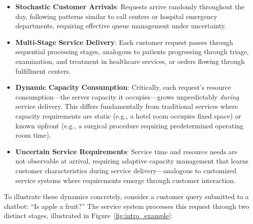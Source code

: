 \documentclass[poms,final,blindrev]{poms1_V1} %
\begin{document}
\begin{itemize}
    \item \textbf{Stochastic Customer Arrivals}: Requests arrive randomly throughout the day, following patterns similar to call centers or hospital emergency departments, requiring effective queue management under uncertainty.
    
    \item \textbf{Multi-Stage Service Delivery}: Each customer request passes through sequential processing stages, analogous to patients progressing through triage, examination, and treatment in healthcare services, or orders flowing through fulfillment centers.
    
    \item \textbf{Dynamic Capacity Consumption}: Critically, each request's resource consumption—the server capacity it occupies—grows unpredictably \textit{during} service delivery. This differs fundamentally from traditional services where capacity requirements are static (e.g., a hotel room occupies fixed space) or known upfront (e.g., a surgical procedure requiring predetermined operating room time).
    
    \item \textbf{Uncertain Service Requirements}: Service time and resource needs are not observable at arrival, requiring adaptive capacity management that learns customer characteristics during service delivery—analogous to customized service systems where requirements emerge through customer interaction.
\end{itemize}

To illustrate these dynamics concretely, consider a customer query submitted to a chatbot: ``Is apple a fruit?'' The service system processes this request through two distinct stages, illustrated in Figure~\ref{fig:intro_example}:
\end{document}
